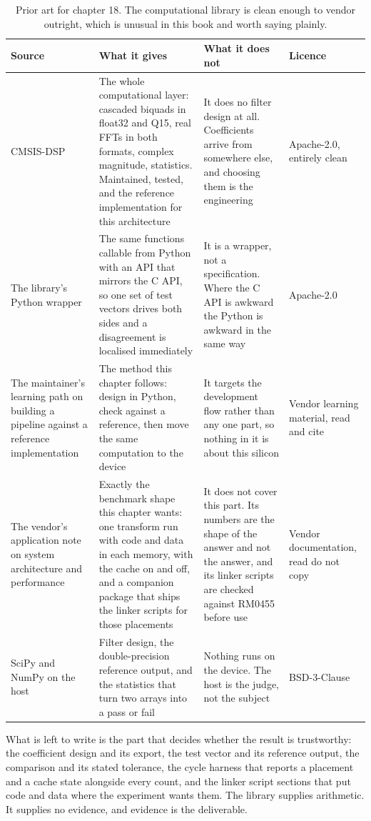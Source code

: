 \begin{table}[H]\centering\small
\begin{tabular}{p{34mm}p{46mm}p{38mm}p{20mm}}
\toprule
Source & What it gives & What it does not & Licence \\
\midrule
CMSIS-DSP & The whole computational layer: cascaded biquads in float32 and Q15, real FFTs in both formats, complex magnitude, statistics. Maintained, tested, and the reference implementation for this architecture & It does no filter design at all. Coefficients arrive from somewhere else, and choosing them is the engineering & Apache-2.0, entirely clean \\
The library's Python wrapper & The same functions callable from Python with an API that mirrors the C API, so one set of test vectors drives both sides and a disagreement is localised immediately & It is a wrapper, not a specification. Where the C API is awkward the Python is awkward in the same way & Apache-2.0 \\
The maintainer's learning path on building a pipeline against a reference implementation & The method this chapter follows: design in Python, check against a reference, then move the same computation to the device & It targets the development flow rather than any one part, so nothing in it is about this silicon & Vendor learning material, read and cite \\
The vendor's application note on system architecture and performance & Exactly the benchmark shape this chapter wants: one transform run with code and data in each memory, with the cache on and off, and a companion package that ships the linker scripts for those placements & It does not cover this part. Its numbers are the shape of the answer and not the answer, and its linker scripts are checked against RM0455 before use & Vendor documentation, read do not copy \\
SciPy and NumPy on the host & Filter design, the double-precision reference output, and the statistics that turn two arrays into a pass or fail & Nothing runs on the device. The host is the judge, not the subject & BSD-3-Clause \\
\bottomrule
\end{tabular}
\caption{Prior art for chapter 18. The computational library is clean enough to vendor outright, which is unusual in this book and worth saying plainly.}
\end{table}

What is left to write is the part that decides whether the result is
trustworthy: the coefficient design and its export, the test vector and its
reference output, the comparison and its stated tolerance, the cycle harness
that reports a placement and a cache state alongside every count, and the
linker script sections that put code and data where the experiment wants them.
The library supplies arithmetic. It supplies no evidence, and evidence is the
deliverable.

